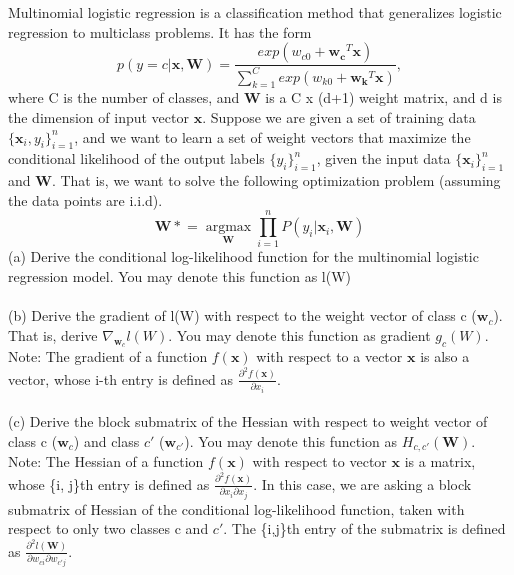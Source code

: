 \documentclass[12pt]{article}
\newenvironment{problem}[2][Problem]{\begin{trivlist}
\item[\hskip \labelsep {\bfseries #1}\hskip \labelsep {\bfseries #2.}]}{\end{trivlist}}
\begin{document}
\begin{problem}{4}
Multinomial logistic regression is a classification method that generalizes logistic regression to multiclass problems. It has the form
$$ p(y=c|\mathbf{x,W}) = \frac{exp(w_{c0} + \mathbf{w_c}^T\mathbf{x})}{\sum_{k=1}^C exp(w_{k0} + \mathbf{w_k}^T\mathbf{x})}, $$
where C is the number of classes, and $\mathbf{W}$ is a C x (d+1) weight matrix, and d is the dimension of input vector $\mathbf{x}$. 
Suppose we are given a set of training data $ \{\mathbf{x}_i, y_i\}_{i=1}^n $, and we want to learn a set of weight vectors that maximize the conditional likelihood of the output labels $ \{y_i\}_{i=1}^n $, given the input data $\{\mathbf{x}_i\}_{i=1}^n$ and $ \mathbf{W} $. That is, we want to solve the following optimization problem (assuming the data points are i.i.d).
$$ \mathbf{W*} = \mathop{argmax} \limits_{\mathbf{W}} \prod_{i=1}^n P(y_i | \mathbf{x}_i, \mathbf{W})$$
(a) Derive the conditional log-likelihood function for the multinomial logistic regression model. You may denote this function as l(W) \\ \\
(b) Derive the gradient of l(W) with respect to the weight vector of class c ($\mathbf{w}_c$). That is, derive $\nabla_{\mathbf{w}_c} l(W)$. You may denote this function as gradient $g_c(W)$. Note: The gradient of a function $f(\mathbf{x})$ with respect to a vector $\mathbf{x}$ is also a vector, whose i-th entry is defined as $ \frac{\partial^2f(\mathbf{x})}{\partial{x_i}} $. \\ \\
(c) Derive the block submatrix of the Hessian with respect to weight vector of class c ($\mathbf{w}_c$) and class $c'$ ($\mathbf{w}_{c'}$). You may denote this function as $H_{c,c'}(\mathbf{W})$. Note: The Hessian of a function $f(\mathbf{x})$ with respect to vector $\mathbf{x}$ is a matrix, whose \{i, j\}th entry is defined as $\frac{\partial^2f(\mathbf{x})}{\partial x_i \partial x_j}$. In this case, we are asking a block submatrix of Hessian of the conditional log-likelihood function, taken with respect to only two classes c and $c'$. The \{i,j\}th entry of the submatrix is defined as $\frac{\partial^2l(\mathbf{W})}{\partial w_{ci}\partial w_{c'j}}$.
\end{problem}
\end{document}
